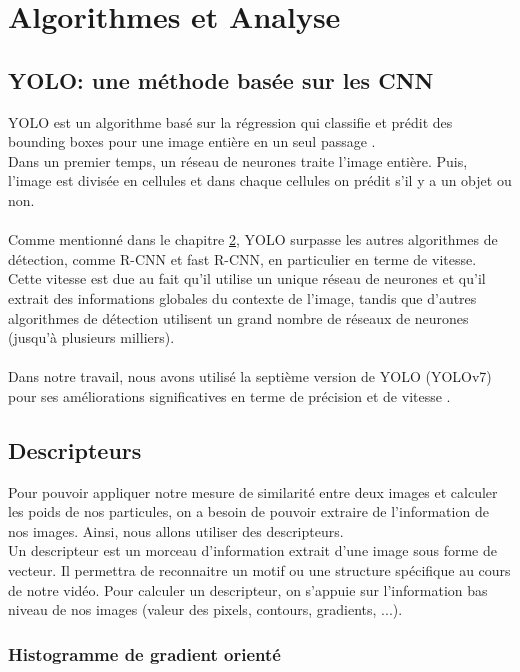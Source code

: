 \pagestyle{plain}
\chapter{Algorithmes et Analyse}


\section{YOLO: une méthode basée sur les CNN}
YOLO est un algorithme basé sur la régression qui classifie et prédit des bounding boxes pour une image entière en un seul passage \cite{redmon_you_2016}.\\
Dans un premier temps, un réseau de neurones traite l'image entière. Puis, l'image est divisée en cellules et dans chaque cellules on prédit s'il y a un objet ou non.\\
\\
Comme mentionné dans le chapitre \hyperlink{chapter.2}{2}, YOLO surpasse les autres algorithmes de détection, comme R-CNN et fast R-CNN, en particulier en terme de vitesse. Cette vitesse est due au fait qu'il utilise un unique réseau de neurones et qu'il extrait des informations globales du contexte de l'image, tandis que d'autres algorithmes de détection utilisent un grand nombre de réseaux de neurones (jusqu'à plusieurs milliers).\\
\\
Dans notre travail, nous avons utilisé la septième version de YOLO (YOLOv7) pour ses améliorations significatives en terme de précision et de vitesse \cite{wang_yolov7_nodate}.




\section{Descripteurs}
Pour pouvoir appliquer notre mesure de similarité entre deux images et calculer les poids de nos particules, on a besoin de pouvoir extraire de l'information de nos images. Ainsi, nous allons utiliser des descripteurs. \\
Un descripteur est un morceau d'information extrait d'une image sous forme de vecteur. Il permettra de reconnaitre un motif ou une structure spécifique au cours de notre vidéo. Pour calculer un descripteur, on s'appuie sur l'information bas niveau de nos images (valeur des pixels, contours, gradients, ...).

\subsection{Histogramme de gradient orienté}

